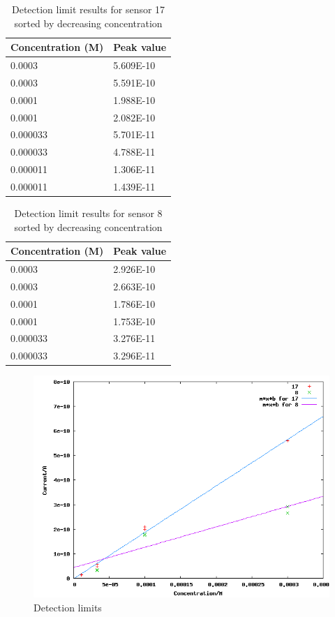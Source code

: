 \begin{table}
	\begin{tabular}{ll}
		Concentration (M) & Peak value \\
		\hline
		0.0003 & 5.609E-10 \\
		0.0003 & 5.591E-10 \\
		0.0001 & 1.988E-10 \\
		0.0001 & 2.082E-10 \\
		0.000033 & 5.701E-11 \\
		0.000033 & 4.788E-11 \\
		0.000011 & 1.306E-11 \\
		0.000011 & 1.439E-11 \\
	\end{tabular}
	\caption[Detection limit results for sensor 17]{Detection limit results for sensor 17 sorted by decreasing concentration}
	\label{limit 17}
\end{table}

\begin{table}
	\begin{tabular}{ll}
		Concentration (M) & Peak value \\
		\hline
		0.0003 & 2.926E-10 \\
		0.0003 & 2.663E-10 \\
		0.0001 & 1.786E-10 \\
		0.0001 & 1.753E-10 \\
		0.000033 & 3.276E-11 \\
		0.000033 & 3.296E-11 \\
	\end{tabular}
	\caption[Detection limit results for sensor 8]{Detection limit results for sensor 8 sorted by decreasing concentration}
	\label{limit 8}
\end{table}

\begin{figure}
\centering
\includegraphics[width=\linewidth]{figures/limit.png}
\caption{Detection limits}
\label{limit figure}
\end{figure}

